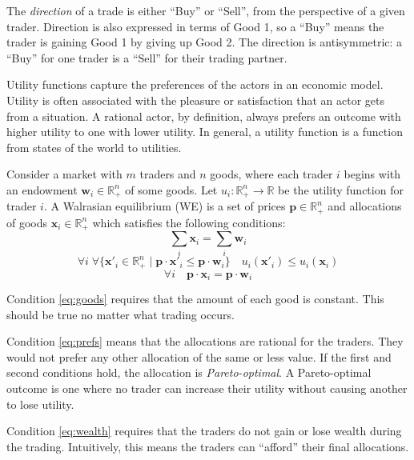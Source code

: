 \documentclass[12pt,a4paper,titlepage]{article}
\begin{document}
The \textit{direction} of a trade is either ``Buy'' or ``Sell'', from the perspective of a given trader.
Direction is also expressed in terms of Good 1, so a ``Buy'' means the trader is gaining Good 1 by giving up Good 2.
The direction is antisymmetric: a ``Buy'' for one trader is a ``Sell'' for their trading partner.

Utility functions capture the preferences of the actors in an economic model.
Utility is often associated with the pleasure or satisfaction that an actor gets from a situation.
A rational actor, by definition, always prefers an outcome with higher utility to one with lower utility. 
In general, a utility function is a function from states of the world to utilities.

Consider a market with $m$ traders and $n$ goods, where each trader $i$ begins with an endowment $\mathbf{w}_i \in \mathbb{R}^n_+ $ of some goods.
Let $u_i : \mathbb{R}^n_+ \rightarrow \mathbb{R}$ be the utility function for trader $i$.
A Walrasian equilibrium (WE) is a set of prices $\mathbf{p} \in \mathbb{R}^n_+$ and allocations of goods $\mathbf{x}_i \in \mathbb{R}^n_+$ which satisfies the following conditions:
\begin{equation}\label{eq:goods}
  \sum_i \mathbf{x}_i = \sum_i \mathbf{w}_i 
\end{equation}
\begin{equation}\label{eq:prefs}
  \forall{i} \; \forall{\{\mathbf{x'}_i \in \mathbb{R}^n_+ \mid \mathbf{p} \cdot \mathbf{x'}_i \leq \mathbf{p} \cdot \mathbf{w}_i}\}
  \quad
  u_i(\mathbf{x'}_i) \leq u_i(\mathbf{x}_i) 
\end{equation}
\begin{equation}\label{eq:wealth}
  \forall{i} \quad \mathbf{p} \cdot \mathbf{x}_i = \mathbf{p} \cdot \mathbf{w}_i
\end{equation}

Condition \ref{eq:goods} requires that the amount of each good is constant.
This should be true no matter what trading occurs.

Condition \ref{eq:prefs} means that the allocations are rational for the traders.
They would not prefer any other allocation of the same or less value.
If the first and second conditions hold, the allocation is \textit{Pareto-optimal}.
A Pareto-optimal outcome is one where no trader can increase their utility without causing another to lose utility.

Condition \ref{eq:wealth} requires that the traders do not gain or lose wealth during the trading.
Intuitively, this means the traders can ``afford'' their final allocations.
\end{document}
